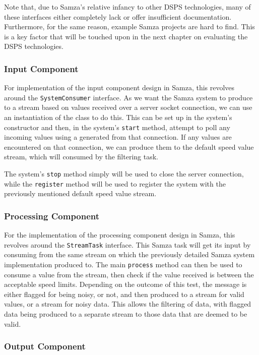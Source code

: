 Note that, due to Samza's relative infancy to other DSPS technologies, many of these interfaces either completely lack
or offer insufficient documentation. Furthermore, for the same reason, example Samza projects are hard to find. This is
a key factor that will be touched upon in the next chapter on evaluating the DSPS technologies.

\subsubsection{Input Component}

For implementation of the input component design in Samza, this revolves around the \texttt{SystemConsumer} interface.
As we want the Samza system to produce to a stream based on values received over a server socket connection, we can use
an instantiation of the  class to do this. This can be set up in the system's constructor
and then, in the system's \texttt{start} method, attempt to poll any incoming values using a  generated
from that connection. If any values are encountered on that connection, we can produce them to the default speed value
stream, which will consumed by the filtering task.

The system's \texttt{stop} method simply will be used to close the server connection, while the \texttt{register} method will
be used to register the system with the previously mentioned default speed value stream.

\subsubsection{Processing Component}

For the implementation of the processing component design in Samza, this revolves around the \texttt{StreamTask} interface.
This Samza task will get its input by consuming from the same stream on which the previously detailed Samza system implementation
produced to. The main \texttt{process} method can then be used to consume a value from the stream, then check if the value
received is between the acceptable speed limits. Depending on the outcome of this test, the message is either flagged for
being noisy, or not, and then produced to a stream for valid values, or a stream for noisy data. This allows the filtering
of data, with flagged data being produced to a separate stream to those data that are deemed to be valid.

\subsubsection{Output Component}

